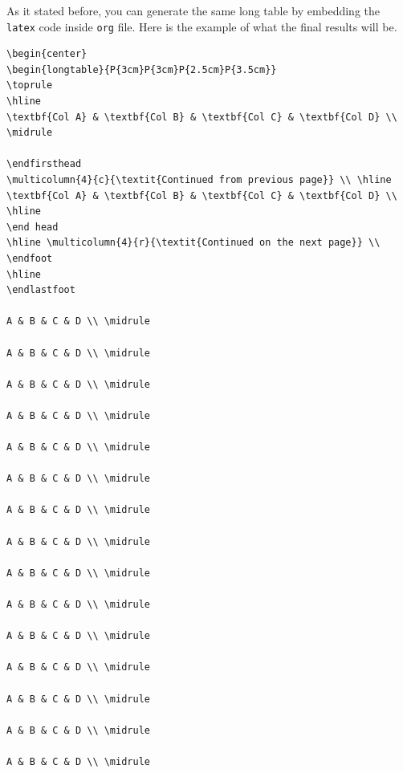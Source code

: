 \documentclass[12pt]{report}
\begin{document}
\begin{appendix}
As it stated before, you can generate the same long table by embedding the
\texttt{latex} code inside \texttt{org} file. Here is the example of what the final results
will be.

\begin{verbatim}
\begin{center}
\begin{longtable}{P{3cm}P{3cm}P{2.5cm}P{3.5cm}}
\toprule
\hline
\textbf{Col A} & \textbf{Col B} & \textbf{Col C} & \textbf{Col D} \\ \midrule

\endfirsthead
\multicolumn{4}{c}{\textit{Continued from previous page}} \\ \hline
\textbf{Col A} & \textbf{Col B} & \textbf{Col C} & \textbf{Col D} \\ \hline
\end head
\hline \multicolumn{4}{r}{\textit{Continued on the next page}} \\
\endfoot
\hline
\endlastfoot

A & B & C & D \\ \midrule

A & B & C & D \\ \midrule

A & B & C & D \\ \midrule

A & B & C & D \\ \midrule

A & B & C & D \\ \midrule

A & B & C & D \\ \midrule

A & B & C & D \\ \midrule

A & B & C & D \\ \midrule

A & B & C & D \\ \midrule

A & B & C & D \\ \midrule

A & B & C & D \\ \midrule

A & B & C & D \\ \midrule

A & B & C & D \\ \midrule

A & B & C & D \\ \midrule

A & B & C & D \\ \midrule


\end{verbatim}
\end{appendix}
\end{document}
